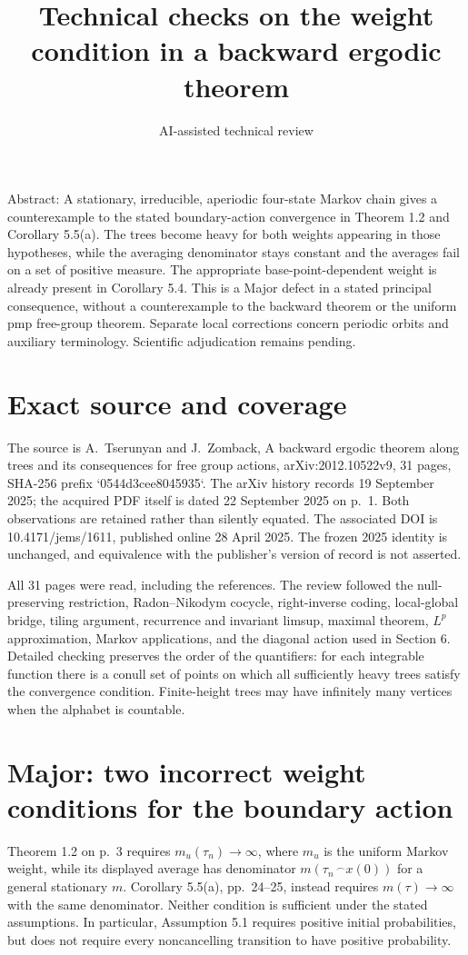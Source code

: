 \documentclass[10pt]{article}
\title{Technical checks on the weight condition in a backward ergodic theorem}
\author{AI-assisted technical review}
\date{}
\begin{document}
\maketitle
Abstract: A stationary, irreducible, aperiodic four-state Markov chain gives a counterexample to the stated boundary-action convergence in Theorem 1.2 and Corollary 5.5(a). The trees become heavy for both weights appearing in those hypotheses, while the averaging denominator stays constant and the averages fail on a set of positive measure. The appropriate base-point-dependent weight is already present in Corollary 5.4. This is a Major defect in a stated principal consequence, without a counterexample to the backward theorem or the uniform pmp free-group theorem. Separate local corrections concern periodic orbits and auxiliary terminology. Scientific adjudication remains pending.\par
\section*{Exact source and coverage}
The source is A. Tserunyan and J. Zomback, A backward ergodic theorem along trees and its consequences for free group actions, arXiv:2012.10522v9, 31 pages, SHA-256 prefix `0544d3cee8045935`. The arXiv history records 19 September 2025; the acquired PDF itself is dated 22 September 2025 on p. 1. Both observations are retained rather than silently equated. The associated DOI is 10.4171/jems/1611, published online 28 April 2025. The frozen 2025 identity is unchanged, and equivalence with the publisher’s version of record is not asserted.\par
All 31 pages were read, including the references. The review followed the null-preserving restriction, Radon–Nikodym cocycle, right-inverse coding, local-global bridge, tiling argument, recurrence and invariant limsup, maximal theorem, \(L^p\) approximation, Markov applications, and the diagonal action used in Section 6. Detailed checking preserves the order of the quantifiers: for each integrable function there is a conull set of points on which all sufficiently heavy trees satisfy the convergence condition. Finite-height trees may have infinitely many vertices when the alphabet is countable.\par
\section*{Major: two incorrect weight conditions for the boundary action}
Theorem 1.2 on p. 3 requires \(m_u(\tau_n)\to\infty\), where \(m_u\) is the uniform Markov weight, while its displayed average has denominator \(m(\tau_n\,^{\frown}x(0))\) for a general stationary \(m\). Corollary 5.5(a), pp. 24–25, instead requires \(m(\tau)\to\infty\) with the same denominator. Neither condition is sufficient under the stated assumptions. In particular, Assumption 5.1 requires positive initial probabilities, but does not require every noncancelling transition to have positive probability.\par
\end{document}
